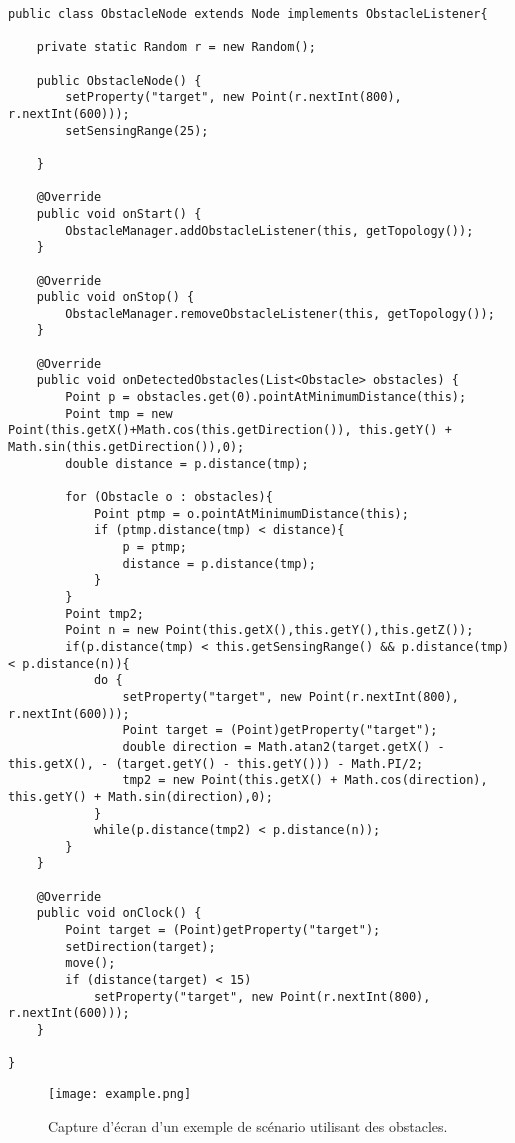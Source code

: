 \documentclass{article}
\begin{document}
\begin{lstlisting}[frame=shadowbox,captionpos=b,caption={Classe ObstacleNode},abovecaptionskip=2ex,label={obstaclenode}]
public class ObstacleNode extends Node implements ObstacleListener{

    private static Random r = new Random();

    public ObstacleNode() {
        setProperty("target", new Point(r.nextInt(800), r.nextInt(600)));
        setSensingRange(25);

    }

    @Override
    public void onStart() {
        ObstacleManager.addObstacleListener(this, getTopology());
    }

    @Override
    public void onStop() {
        ObstacleManager.removeObstacleListener(this, getTopology());
    }

    @Override
    public void onDetectedObstacles(List<Obstacle> obstacles) {
        Point p = obstacles.get(0).pointAtMinimumDistance(this);
        Point tmp = new Point(this.getX()+Math.cos(this.getDirection()), this.getY() + Math.sin(this.getDirection()),0);
        double distance = p.distance(tmp);

        for (Obstacle o : obstacles){
            Point ptmp = o.pointAtMinimumDistance(this);
            if (ptmp.distance(tmp) < distance){
                p = ptmp;
                distance = p.distance(tmp);
            }
        }
        Point tmp2;
        Point n = new Point(this.getX(),this.getY(),this.getZ());
        if(p.distance(tmp) < this.getSensingRange() && p.distance(tmp) < p.distance(n)){
            do {
                setProperty("target", new Point(r.nextInt(800), r.nextInt(600)));
                Point target = (Point)getProperty("target");
                double direction = Math.atan2(target.getX() - this.getX(), - (target.getY() - this.getY())) - Math.PI/2;
                tmp2 = new Point(this.getX() + Math.cos(direction), this.getY() + Math.sin(direction),0);
            }
            while(p.distance(tmp2) < p.distance(n));
        }
    }

    @Override
    public void onClock() {
        Point target = (Point)getProperty("target");
        setDirection(target);
        move();
        if (distance(target) < 15)
            setProperty("target", new Point(r.nextInt(800), r.nextInt(600)));
    }

}
\end{lstlisting}

\begin{figure}[h]
\centering
\texttt{[image: example.png]}
\caption{Capture d'écran d'un exemple de scénario utilisant des obstacles.}
\label{obstacle:fig:exemple}
\end{figure}
\end{document}
